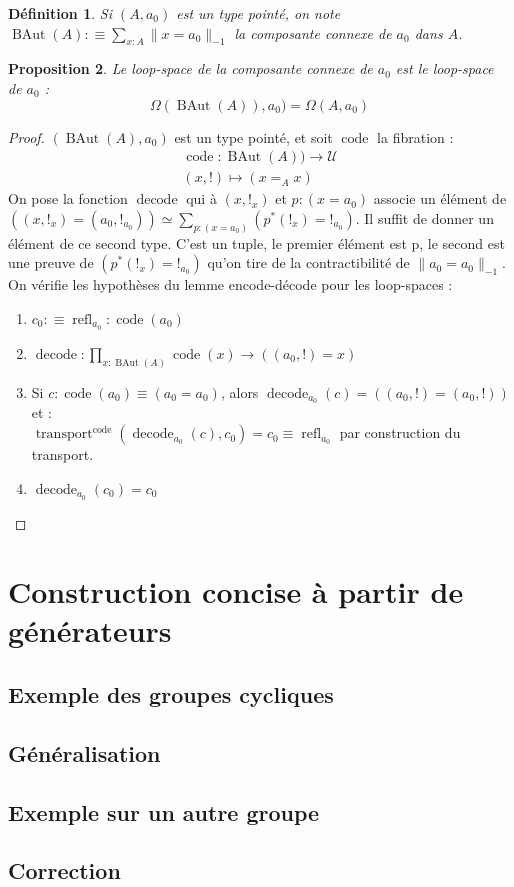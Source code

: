 \documentclass{article}
\let\Pr\relax
\DeclareMathOperator{\Pr}{Pr}
\DeclareMathOperator{\gset}{G-Set}
\DeclareMathOperator{\Torsor}{Torsor}
\DeclareMathOperator{\code}{code}
\DeclareMathOperator{\decode}{decode}
\DeclareMathOperator{\transport}{transport}
\DeclareMathOperator{\refl}{refl}
\DeclareMathOperator{\BAut}{BAut}
\newtheorem{definition}{Définition}[section]
\newtheorem{proposition}[definition]{Proposition}
\begin{document}

\begin{definition}
  Si $(A,a_0)$ est un type pointé, on note $\BAut(A) :\equiv \sum_{x : A}\| x = a_{0} \|_{-1}$ la composante connexe de $a_0$ dans $A$.
\end{definition}

\begin{proposition}
  Le loop-space de la composante connexe de $a_0$ est le loop-space de $a_0$ :
  \[\Omega(\BAut(A)), a_0) = \Omega(A,a_0)\]
\end{proposition}

\begin{proof}
  $(\BAut(A), a_0)$ est un type pointé, et soit $\code$ la fibration :
  \begin{gather*}
    \code : \BAut(A)) \to \mathcal{U} \\
    (x,!) \mapsto (x =_{A} x)
  \end{gather*}
  On pose la fonction $\decode$ qui à $(x,!_{x})$ et $p : (x = a_0)$ associe un élément de $((x,!_{x}) = (a_0,!_{a_{0}})) \simeq \sum_{p : (x = a_0)}(p^{*}(!_{x}) = !_{a_0})$. Il suffit de donner un élément de ce second type. C'est un tuple, le premier élément est p, le second est une preuve de $(p^{*}(!_{x}) = !_{a_{0}})$ qu'on tire de la contractibilité de $\|a_0 = a_{0}\|_{-1}$. On vérifie les hypothèses du lemme encode-décode pour les loop-spaces :
  \begin{enumerate}
    \item $c_0 :\equiv \refl_{a_0} : \code(a_0)$
    \item $\decode : \prod_{x : \BAut(A)} \code(x) \to ((a_{0},!) = x)$
    \item Si $c : \code(a_0) \equiv (a_0 = a_0)$, alors $\decode_{a_0}(c) = ((a_{0},!) = (a_{0},!))$ et :\\
          $\transport^{\code}(\decode_{a_0}(c), c_0) = c_0 \equiv \refl_{a_0}$ par construction du transport.
    \item $\decode_{a_0}(c_0) = c_{0}$
  \end{enumerate}
\end{proof}


\section{Construction concise à partir de générateurs}

\subsection{Exemple des groupes cycliques}
\subsection{Généralisation}
\subsection{Exemple sur un autre groupe} %
\subsection{Correction}
\end{document}
